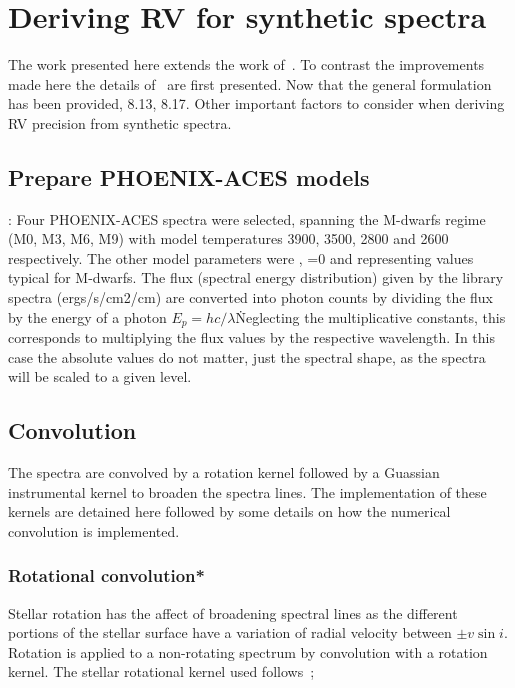 
\section{Deriving RV for synthetic spectra}
The work presented here extends the work of~\citep{figueira_radial_2016}.
To contrast the improvements made here the details of~\citep{figueira_radial_2016} are first presented.
Now that the general formulation has been provided, 8.13, 8.17.
Other important factors to consider when deriving RV precision from synthetic spectra.

\subsection{Prepare {PHOENIX-ACES} models}:
Four {PHOENIX-ACES} spectra were selected, spanning the M-dwarfs regime (M0, M3, M6, M9) with model temperatures 3900, 3500, 2800 and 2600\K{} respectively. The other model parameters were , \feh{}=0 and  representing values typical for M-dwarfs.
The flux (spectral energy distribution) given by the library spectra (ergs/s/cm2/cm) are converted into photon counts by dividing the flux by the energy of a photon \({E}_{p}=hc/\lambda\)\. Neglecting the multiplicative constants, this corresponds to multiplying the flux values by the respective wavelength.
In this case the absolute values do not matter, just the spectral shape, as the spectra will be scaled to a given \snr{} level.

\subsection{Convolution}
The spectra are convolved by a rotation kernel followed by a Guassian instrumental kernel to broaden the spectra lines. 
The implementation of these kernels are detained here followed by some details on how the  numerical convolution is implemented.

\subsubsection{Rotational convolution*}
\label{subsec:rotational_convolution}
Stellar rotation has the affect of broadening spectral lines as the different portions of the stellar surface have a variation of radial velocity between \(\pm v \sin i\).
Rotation is applied to a non-rotating spectrum by convolution with a rotation kernel.
The stellar rotational kernel used follows~\citet{gray_observation_2005};

